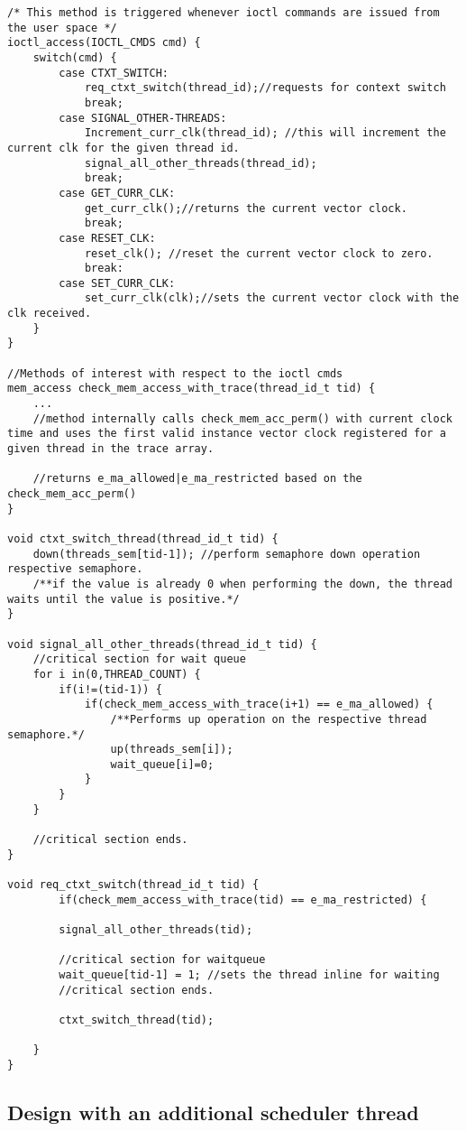 \documentclass[11pt]{article}
\begin{document}
\begin{lstlisting}[title=Kernel Space - IOCTL, style=customc]
/* This method is triggered whenever ioctl commands are issued from the user space */
ioctl_access(IOCTL_CMDS cmd) {	
	switch(cmd) {
		case CTXT_SWITCH: 
			req_ctxt_switch(thread_id);//requests for context switch
			break;
		case SIGNAL_OTHER-THREADS:
			Increment_curr_clk(thread_id); //this will increment the current clk for the given thread id.
			signal_all_other_threads(thread_id);
			break;
		case GET_CURR_CLK:
			get_curr_clk();//returns the current vector clock.
			break;
		case RESET_CLK:
			reset_clk(); //reset the current vector clock to zero.
			break:		
		case SET_CURR_CLK:
			set_curr_clk(clk);//sets the current vector clock with the clk received.
	}
}

//Methods of interest with respect to the ioctl cmds
mem_access check_mem_access_with_trace(thread_id_t tid) {
	...
	//method internally calls check_mem_acc_perm() with current clock time and uses the first valid instance vector clock registered for a given thread in the trace array.
		
	//returns e_ma_allowed|e_ma_restricted based on the check_mem_acc_perm()
}

void ctxt_switch_thread(thread_id_t tid) {	
	down(threads_sem[tid-1]); //perform semaphore down operation respective semaphore.
	/**if the value is already 0 when performing the down, the thread waits until the value is positive.*/
}

void signal_all_other_threads(thread_id_t tid) {
	//critical section for wait queue
	for i in(0,THREAD_COUNT) {
		if(i!=(tid-1)) {
			if(check_mem_access_with_trace(i+1) == e_ma_allowed) {
				/**Performs up operation on the respective thread semaphore.*/
				up(threads_sem[i]);
				wait_queue[i]=0;			
			}		
		}
	}	
	
	//critical section ends.
}

void req_ctxt_switch(thread_id_t tid) {
		if(check_mem_access_with_trace(tid) == e_ma_restricted) {

		signal_all_other_threads(tid);
		
		//critical section for waitqueue
		wait_queue[tid-1] = 1; //sets the thread inline for waiting
		//critical section ends.
		
		ctxt_switch_thread(tid);

	}
}

\end{lstlisting}

\subsection*{Design with an additional scheduler thread}
\end{document}
